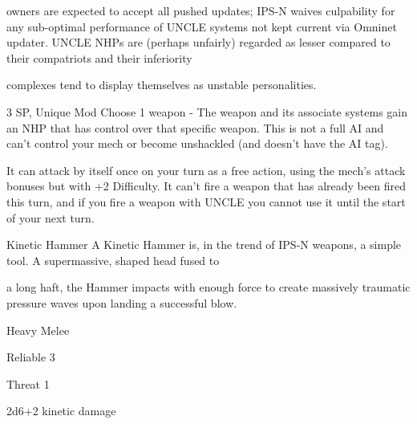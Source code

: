 owners are expected to accept all pushed updates; IPS-N waives culpability for any sub-optimal  
performance of UNCLE systems not kept current via Omninet updater.   
UNCLE NHPs are (perhaps unfairly) regarded as lesser compared to their compatriots and their inferiority  

complexes tend to display themselves as unstable personalities.  

3 SP, Unique  
Mod  
Choose 1 weapon - The weapon and its associate systems gain an NHP that has control over  
that specific weapon. This is not a full AI and can’t control your mech or become unshackled  
(and doesn’t have the AI tag).
 

It can attack by itself once on your turn as a free action, using the mech’s attack bonuses but  
with +2 Difficulty. It can’t fire a weapon that has already been fired this turn, and if you fire a  
weapon with UNCLE you cannot use it until the start of your next turn.
 

Kinetic Hammer  
A Kinetic Hammer is, in the trend of IPS-N weapons, a simple tool. A supermassive, shaped head fused to  

a long haft, the Hammer impacts with enough force to create massively traumatic pressure waves upon  
landing a successful blow.   

Heavy Melee
 
Reliable 3
 
Threat 1
 
2d6+2 kinetic damage  

                         